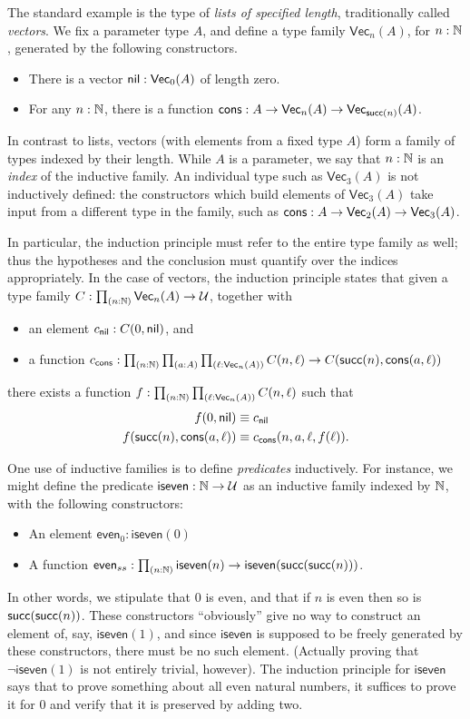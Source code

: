 \newcommand{\vect}[2]{\ensuremath{\mathsf{Vec}_{#1}(#2)}\xspace}

The standard example is the type of \emph{lists of specified length}, traditionally called \emph{vectors}.
We fix a parameter type $A$, and define a type family $\vect n A$, for $n:\mathbb{N}$, generated by the following constructors.
\begin{itemize}
\item There is a vector $\nil:\vect 0 A$ of length zero.
\item For any $n:\mathbb{N}$, there is a function $\cons:A\to \vect n A \to \vect{\suc (n)} A$.
\end{itemize}
In contrast to lists, vectors (with elements from a fixed type $A$) form a family of types indexed by their length.
While $A$ is a parameter, we say that $n:\mathbb{N}$ is an \emph{index} of the inductive family.
An individual type such as $\vect3A$ is not inductively defined: the constructors which build elements of $\vect3A$ take input from a different type in the family, such as $\cons:A \to \vect2A \to \vect3A$.

In particular, the induction principle must refer to the entire type family as well; thus the hypotheses and the conclusion must quantify over the indices appropriately.
In the case of vectors, the induction principle states that given a type family $C:\prd{n:\nat} \vect n A \to \type$, together with
\begin{itemize}
\item an element $c_{\mathsf{nil}} : C(0,\mathsf{nil})$, and
\item a function $c_\cons : \prd{n:\nat}{a:A}{\ell:\vect n A} C(n,\ell) \to C(\suc(n),\cons(a,\ell))$
\end{itemize}
there exists a function $f:\prd{n:\nat}{\ell:\vect n A} C(n,\ell)$ such that
\begin{align*}
  f(0,\mathsf{nil}) &\equiv c_{\mathsf{nil}}\\
  f(\mathsf{succ}(n),\mathsf{cons}(a,\ell)) &\equiv c_{\mathsf{cons}}(n,a,\ell,f(\ell)).
\end{align*}

One use of inductive families is to define \emph{predicates} inductively.
For instance, we might define the predicate $\mathsf{iseven}:\mathbb{N}\to\mathcal{U}$ as an inductive family indexed by $\mathbb{N}$, with the following constructors:
\begin{itemize}
\item An element $\mathsf{even}_0 : \mathsf{iseven}(0)$
\item A function $\mathsf{even}_{ss} : \prd{n:\nat} \mathsf{iseven}(n) \to \mathsf{iseven}(\suc(\suc(n)))$.
\end{itemize}
In other words, we stipulate that $0$ is even, and that if $n$ is even then so is $\mathsf{succ}(\mathsf{succ}(n))$.
These constructors ``obviously'' give no way to construct an element of, say, $\mathsf{iseven}(1)$, and since $\mathsf{iseven}$ is supposed to be freely generated by these constructors, there must be no such element.
(Actually proving that $\neg \mathsf{iseven}(1)$ is not entirely trivial, however).
The induction principle for $\mathsf{iseven}$ says that to prove something about all even natural numbers, it suffices to prove it for $0$ and verify that it is preserved by adding two.

